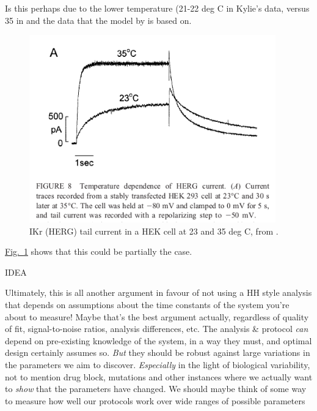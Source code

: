 \documentclass[preprint,authoryear,10pt]{elsarticle}
\newcommand\Fig[2][]{\hyperref[fig:#2]{Fig.~\ref*{fig:#2}\ifstrempty{#1}{}{.#1}}}
\begin{document}
Is this perhaps due to the lower temperature (21-22 deg C in Kylie's data,
versus 35 in \citet{Sanguinetti1990IKIsIKrAndIKs} and the
\citet{Zhou1998IKrHERG} data that the model by \citet{tenTusscher2006Model} is
based on.

\begin{figure}[H]
\centerline{
\includegraphics[width=0.95\textwidth]{fig/zhou-ikr-tail-temperature}
}
\caption{%
IKr (HERG) tail current in a HEK cell at 23 and 35 deg C, from
\citep{Zhou1998IKrHERG}.
}
\label{fig:zhou-ikr-tail-temperature}
\end{figure}

\Fig{zhou-ikr-tail-temperature} shows that this could be partially the case.

IDEA

Ultimately, this is all another argument in favour of not using a HH style
 analysis that depends on assumptions about the time constants of the system
 you're about to measure!
Maybe that's the best argument actually, regardless of quality of fit,
 signal-to-noise ratios, analysis differences, etc.
The analysis \& protocol \emph{can} depend on pre-existing knowledge of the
 system, in a way they must, and optimal design certainly assumes so.
\emph{But} they should be robust against large variations in the parameters we
 aim to discover.
\emph{Especially} in the light of biological variability, not to mention drug
 block, mutations and other instances where we actually want to \emph{show}
 that the parameters have changed.
We should maybe think of some way to measure how well our protocols work over
 wide ranges of possible parameters
\end{document}
